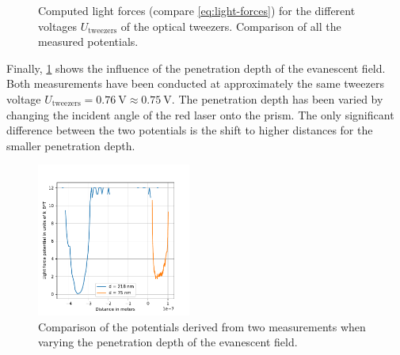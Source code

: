\documentclass[../bericht.tex]{subfiles}
\begin{document}
      \begin{figure}[htb]
        \centering
        \hfill
        \caption{\protect{} Computed light forces (compare \cref{eq:light-forces}) for the different voltages $U_\mathrm{tweezers}$ of the optical tweezers. \protect{} Comparison of all the measured potentials.}
      \end{figure}

      Finally, \cref{fig:two-blocks} shows the influence of the penetration depth of the evanescent field. Both measurements have been conducted at approximately the same tweezers voltage $U_\mathrm{tweezers}=\SI{0,76}{\volt}\approx \SI{0,75}{\volt}$. The penetration depth has been varied by changing the incident angle of the red laser onto the prism. The only significant difference between the two potentials is the shift to higher distances for the smaller penetration depth.

      \begin{figure}[htb]
        \centering
        \includegraphics[width=0.45\textwidth]{figures/potentials12.pdf}
        \caption{Comparison of the potentials derived from two measurements when varying the penetration depth of the evanescent field.}
        \label{fig:two-blocks}
      \end{figure}
\end{document}
